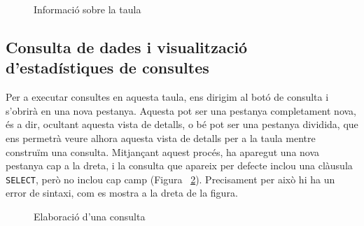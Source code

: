 \documentclass[12pt,longbibliography]{article}
\theoremstyle{definition}
\theoremstyle{remark}
\begin{document}
\begin{figure}[h!]
\par
{}%
\hfill
{}%
\par

\caption{Informació sobre la taula}
\label{fig:bq13}
\end{figure}



\subsection{Consulta de dades i visualització d'estadístiques de consultes}

Per a executar consultes en aquesta taula, ens dirigim al botó de consulta i s'obrirà en una nova pestanya. Aquesta pot ser una pestanya completament nova, és a dir, ocultant aquesta vista de detalls, o bé pot ser una pestanya dividida, que ens permetrà veure alhora aquesta vista de detalls per a la taula mentre construïm una consulta. Mitjançant aquest procés, ha aparegut una nova pestanya cap a la dreta, i la consulta que apareix per defecte inclou una clàusula \verb|SELECT|, però no inclou cap camp (Figura ~\ref{fig:bq14}). Precisament per això hi ha un error de sintaxi, com es mostra a la dreta de la figura. 


\begin{figure}[h!]
\par
{}%
\hfill
{}%
\par

\caption{Elaboració d'una consulta}
\label{fig:bq14}
\end{figure}
\end{document}
